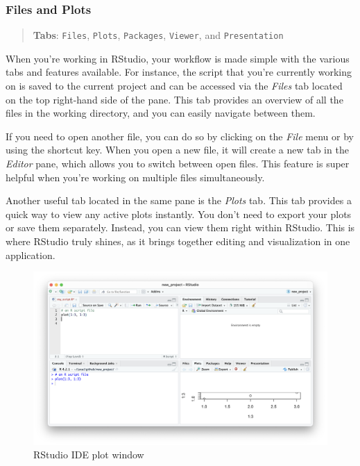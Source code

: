 \documentclass[
]{book}
\begin{document}
\hypertarget{files-and-plots}{%
\subsubsection*{Files and Plots}\label{files-and-plots}}

\begin{quote}
\textbf{Tabs}: \texttt{Files}, \texttt{Plots}, \texttt{Packages}, \texttt{Viewer}, and \texttt{Presentation}
\end{quote}

When you're working in RStudio, your workflow is made simple with the various tabs and features available. For instance, the script that you're currently working on is saved to the current project and can be accessed via the \emph{Files} tab located on the top right-hand side of the pane. This tab provides an overview of all the files in the working directory, and you can easily navigate between them.

If you need to open another file, you can do so by clicking on the \emph{File} menu or by using the shortcut key. When you open a new file, it will create a new tab in the \emph{Editor} pane, which allows you to switch between open files. This feature is super helpful when you're working on multiple files simultaneously.

Another useful tab located in the same pane is the \emph{Plots} tab. This tab provides a quick way to view any active plots instantly. You don't need to export your plots or save them separately. Instead, you can view them right within RStudio. This is where RStudio truly shines, as it brings together editing and visualization in one application.

\begin{figure}
\includegraphics[width=31.94in]{images/02_024_qplot} \caption{\label{fig:2024}RStudio IDE plot window}\label{fig:2024}
\end{figure}
\end{document}
